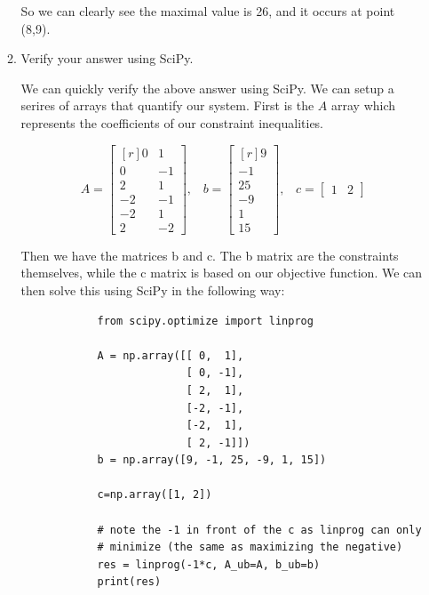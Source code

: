 \documentclass[11pt]{article}
\begin{document}
\begin{enumerate}
\begin{enumerate}
    So we can clearly see the maximal value is 26, and it occurs at point
    (8,9).

    \newpage
\item Verify your answer using SciPy.

    We can quickly verify the above answer using SciPy. We can setup a serires
    of arrays that quantify our system. First is the $A$ array which represents
    the coefficients of our constraint inequalities.

    \[
        A =
        \begin{bmatrix}[r]
            0   &   1   \\
            0   &   -1  \\
            2   &   1   \\
            -2  &   -1  \\
            -2  &   1   \\
            2   &   -2  
        \end{bmatrix}, \;\;\;
        b =
        \begin{bmatrix}[r]
            9   \\
            -1  \\
            25  \\
            -9  \\
            1   \\
            15
        \end{bmatrix}, \;\;\;
        c = 
        \begin{bmatrix}
            1  &  2   
        \end{bmatrix}
    \]

    Then we have the matrices b and c. The b matrix are the constraints
    themselves, while the c matrix is based on our objective function. We can
    then solve this using SciPy in the following way:

    \begin{center}
        \begin{verbatim}
            from scipy.optimize import linprog

            A = np.array([[ 0,  1],
                          [ 0, -1],
                          [ 2,  1],
                          [-2, -1],
                          [-2,  1],
                          [ 2, -1]])
            b = np.array([9, -1, 25, -9, 1, 15])
            
            c=np.array([1, 2])
            
            # note the -1 in front of the c as linprog can only 
            # minimize (the same as maximizing the negative)
            res = linprog(-1*c, A_ub=A, b_ub=b)
            print(res)
        \end{verbatim}
    \end{center}


\end{enumerate}
\end{enumerate}
\end{document}
